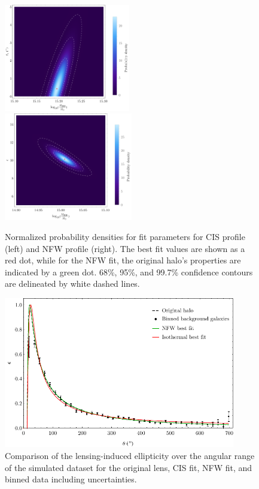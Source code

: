 \documentclass[10pt]{article}
\begin{document}
\begin{figure}
    \centering
    \includegraphics[width=0.49\textwidth]{isothermalfitparams.png}
    \includegraphics[width=0.5\textwidth]{nfwfitparams.png}
    \caption{Normalized probability densities for fit parameters for CIS profile (left) and NFW profile (right). The best fit values are shown as a red dot, while for the NFW fit, the original halo's properties are indicated by a green dot. 68\%, 95\%, and 99.7\% confidence contours are delineated by white dashed lines.}
    \label{fits}
\end{figure}

\begin{figure}
    \centering
    \includegraphics[width=0.9\textwidth]{comparison.pdf}
    \caption{Comparison of the lensing-induced ellipticity over the angular range of the simulated dataset for the original lens, CIS fit, NFW fit, and binned data including uncertainties.}
    \label{fitcomparison}
\end{figure}
\end{document}
